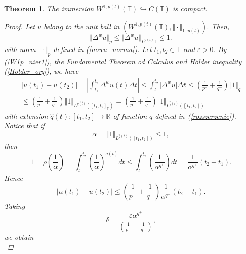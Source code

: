 \documentclass[12pt,a4paper,oneside,titlepage]{article}
\newtheorem{Twierdzenie}{Theorem}
\renewcommand{\epsilon}{\varepsilon}
\begin{document}
\begin{Twierdzenie}
The immersion $W^{1,p(t)}(\mathbb{T}) \hookrightarrow C(\mathbb{T}) $ is compact.
\begin{proof}
Let $u $ belong to the unit ball in $(W^{1,p(t)}(\mathbb{T}), \Vert \cdot \Vert_{1,p(t)})$.
Then,
\begin{equation}
\label{W1p_nier1}
\Vert \Delta^{w} u \Vert_{p} \leq \Vert \Delta^{w} u \Vert_{L^{p(t)}\mathbb{T}} \leq 1. 
\end{equation}
with norm $\Vert \cdot \Vert_{p}$ defined in (\ref{nowa_norma}). Let $t_1, t_2 \in \mathbb{T}$ and $\epsilon>0$.
 By (\ref{W1p_nier1}), the Fundamental Theorem od Calculus and Hölder inequality (\ref{Holder_org}), we have
\begin{equation}
\begin{split}
\nonumber
\vert u(t_1) - u(t_2) \vert = \left\vert \int_{t_1}^{t_2} \Delta^{w} u(t) \Delta t \right\vert \leq  \int_{t_1}^{t_2} \vert \Delta^{w} u \vert \Delta t \leq \left( \frac{1}{p^-}+\frac{1}{q^-} \right) \Vert 1 \Vert_{q} \\    \leq  \left( \frac{1}{p^-}+\frac{1}{q^-} \right) \Vert 1 \Vert_{L^{q(t)}([t_1,t_2]_{\mathbb{T}})} =  \left( \frac{1}{p^-}+\frac{1}{q^-} \right) \Vert 1 \Vert_{L^{\widehat{q}(t)}([t_1, t_2])} 
\end{split}
\end{equation}
with extension $\widehat{q}(t):[t_1,t_2] \rightarrow \mathbb{R}$ of function $q$ defined in (\ref{rozszerzenie}). Notice that if 
\begin{equation}
\nonumber
\alpha =\Vert 1 \Vert_{{L^{\widehat{q}(t)}([t_1,t_2])}} \leq 1 ,
\end{equation}
then
\begin{equation}
\label{Ascoli_1}
1 = \rho \left( \frac{1}{\alpha} \right) = \int_{t_1}^{t_2} \left( \frac{1}{\alpha} \right)^{q(t)} dt \leq \int_{t_1}^{t_2} \left( \frac{1}{\alpha^{q^+}} \right) dt  = \frac{1}{\alpha^{q^+}} (t_2-t_1).
\end{equation}
Hence
\begin{equation}
\nonumber 
\vert u(t_1) - u(t_2) \vert \leq  \left( \frac{1}{p^-}+\frac{1}{q^-} \right) \frac{1}{\alpha^{q^+}} (t_2-t_1).
\end{equation}
Taking 
\begin{equation}
\nonumber
\delta =  \frac{\epsilon \alpha^{q^+} }{\left( \frac{1}{p^-}+\frac{1}{q^-} \right)},
\end{equation}
we obtain
\begin{equation}
\nonumber

\end{equation}
\end{proof}
\end{Twierdzenie}
\end{document}
